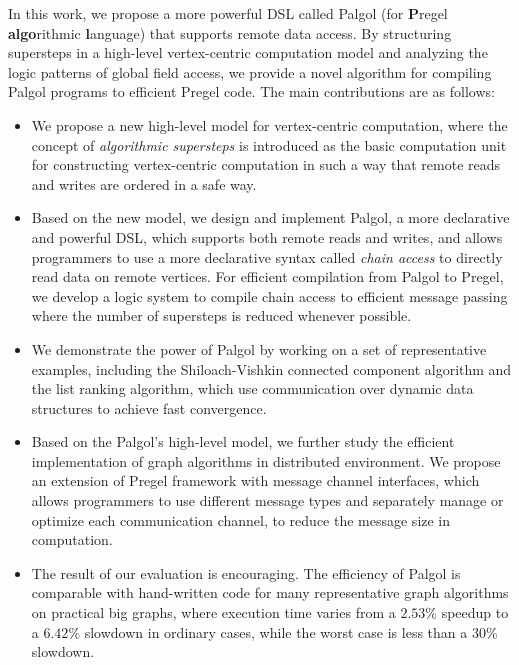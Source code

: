 \documentclass{sokendai_thesis} %
\begin{document}
In this work, we propose a more powerful DSL called Palgol (for {\bf P}regel {\bf algo}rithmic {\bf l}anguage) that supports remote data access.
By structuring supersteps in a high-level vertex-centric computation model and analyzing the logic patterns of global field access, we provide a novel algorithm for compiling Palgol programs to efficient Pregel code. 
The main contributions are as follows:
\begin{itemize}\setlength\itemsep{0em}
 \item
  We propose a new high-level model for vertex-centric computation, where the concept of \emph{algorithmic supersteps} is introduced as the basic computation unit for constructing vertex-centric computation in such a way that remote reads and writes are ordered in a safe way.

 \item
  Based on the new model, we design and implement Palgol, a more declarative and powerful DSL, which supports both remote reads and writes, and allows programmers to use a more declarative syntax called \emph{chain access} to directly read data on remote vertices.
  For efficient compilation from Palgol to Pregel, we develop a logic system to compile chain access to efficient message passing where the number of supersteps is reduced whenever possible. %

 \item
  We demonstrate the power of Palgol by working on a set of representative examples, including the Shiloach-Vishkin connected component algorithm and the list ranking algorithm, which use communication over dynamic data structures to achieve fast convergence.

 \item
  Based on the Palgol's high-level model, we further study the efficient implementation of graph algorithms in distributed environment.
  We propose an extension of Pregel framework with message channel interfaces, which allows programmers to use different message types and separately manage or optimize each communication channel, to reduce the message size in computation.

 \item
  The result of our evaluation is encouraging.
  The efficiency of Palgol is comparable with hand-written code for many representative graph algorithms on practical big graphs, where execution time varies from a $2.53\%$ speedup to a $6.42\%$ slowdown in ordinary cases, while the worst case is less than a $30\%$ slowdown.

\end{itemize}
\end{document}
